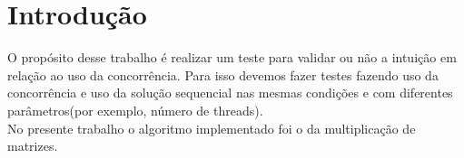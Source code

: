 \section{Introdução}
O propósito desse trabalho é realizar um teste para validar ou não a intuição em relação ao uso da concorrência. Para isso devemos fazer testes fazendo uso da concorrência e uso da solução sequencial nas mesmas condições e com diferentes parâmetros(por exemplo, número de threads).\\
No presente trabalho o algoritmo implementado foi o da multiplicação de matrizes.
